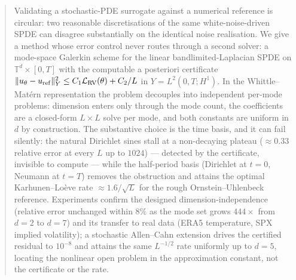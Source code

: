 \begin{abstract}
Validating a stochastic-PDE surrogate against a numerical reference is
circular: two reasonable discretisations of the same white-noise-driven
SPDE can disagree substantially on the identical noise realisation. We
give a method whose error control never routes through a second
solver: a mode-space Galerkin scheme for the linear
bandlimited-Laplacian SPDE on $\mathbb{T}^d \times [0, T]$ with the
computable a posteriori certificate
$\|u_\theta - u_{\rm ref}\|_Y^2 \le C_1\mathcal{L}_{\rm RV}(\theta) + C_2/L$
in $Y = L^2(0, T; H^1)$. In the Whittle--Mat\'ern representation the
problem decouples into independent per-mode problems: dimension enters
only through the mode count, the coefficients are a closed-form
$L \times L$ solve per mode, and both constants are uniform in $d$ by
construction. The substantive choice is the time basis, and it can
fail silently: the natural Dirichlet sines stall at a non-decaying
plateau ($\approx 0.33$ relative error at every $L$ up to $1024$) ---
detected by the certificate, invisible to compute --- while the
half-period basis (Dirichlet at $t = 0$, Neumann at $t = T$) removes
the obstruction and attains the optimal Karhunen--Lo\`eve rate
$\approx 1.6/\sqrt{L}$ for the rough Ornstein--Uhlenbeck reference.
Experiments confirm the designed dimension-independence (relative
error unchanged within $8\%$ as the mode set grows $444\times$ from
$d = 2$ to $d = 7$) and its transfer to real data (ERA5 temperature,
SPX implied volatility); a stochastic Allen--Cahn extension drives the
certified residual to $10^{-8}$ and attains the same $L^{-1/2}$ rate
uniformly up to $d = 5$, locating the nonlinear open problem in the
approximation constant, not the certificate or the rate.
\end{abstract}
